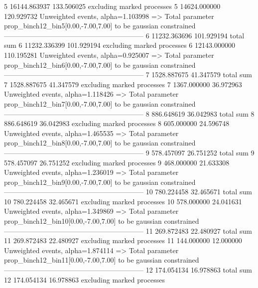 5          16144.863937    133.506025      excluding marked processes    
5          14624.000000    120.929732      Unweighted events, alpha=1.103998
  => Total parameter prop_binch12_bin5[0.00,-7.00,7.00] to be gaussian constrained
------------------------------------------------------------
6          11232.363696    101.929194      total sum                     
6          11232.336399    101.929194      excluding marked processes    
6          12143.000000    110.195281      Unweighted events, alpha=0.925007
  => Total parameter prop_binch12_bin6[0.00,-7.00,7.00] to be gaussian constrained
------------------------------------------------------------
7          1528.887675     41.347579       total sum                     
7          1528.887675     41.347579       excluding marked processes    
7          1367.000000     36.972963       Unweighted events, alpha=1.118426
  => Total parameter prop_binch12_bin7[0.00,-7.00,7.00] to be gaussian constrained
------------------------------------------------------------
8          886.648619      36.042983       total sum                     
8          886.648619      36.042983       excluding marked processes    
8          605.000000      24.596748       Unweighted events, alpha=1.465535
  => Total parameter prop_binch12_bin8[0.00,-7.00,7.00] to be gaussian constrained
------------------------------------------------------------
9          578.457097      26.751252       total sum                     
9          578.457097      26.751252       excluding marked processes    
9          468.000000      21.633308       Unweighted events, alpha=1.236019
  => Total parameter prop_binch12_bin9[0.00,-7.00,7.00] to be gaussian constrained
------------------------------------------------------------
10         780.224458      32.465671       total sum                     
10         780.224458      32.465671       excluding marked processes    
10         578.000000      24.041631       Unweighted events, alpha=1.349869
  => Total parameter prop_binch12_bin10[0.00,-7.00,7.00] to be gaussian constrained
------------------------------------------------------------
11         269.872483      22.480927       total sum                     
11         269.872483      22.480927       excluding marked processes    
11         144.000000      12.000000       Unweighted events, alpha=1.874114
  => Total parameter prop_binch12_bin11[0.00,-7.00,7.00] to be gaussian constrained
------------------------------------------------------------
12         174.054134      16.978863       total sum                     
12         174.054134      16.978863       excluding marked processes    
